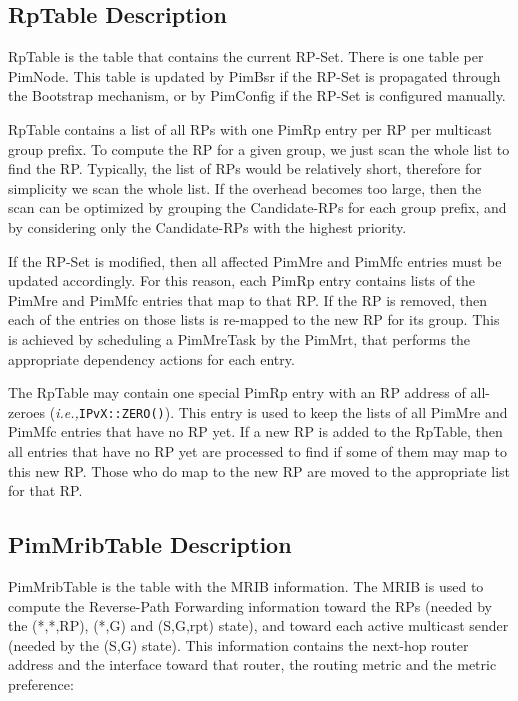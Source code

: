 \documentclass[11pt]{article}
\newcommand{\ie}{\emph{i.e.,}\xspace}
\begin{document}
\subsection{RpTable Description}

RpTable is the table that contains the current RP-Set. There is one
table per PimNode. This table is updated by PimBsr if the RP-Set is
propagated through the Bootstrap mechanism, or by PimConfig if the
RP-Set is configured manually.

RpTable contains a list of all RPs with one PimRp entry per RP per
multicast group prefix. To compute the RP for a given group,
we just scan the whole list to find the RP.
Typically, the list of RPs would be relatively short, therefore for
simplicity we scan the whole list. If the overhead becomes too large,
then the scan can be optimized by grouping the Candidate-RPs
for each group prefix, and by considering only the Candidate-RPs with
the highest priority.

If the RP-Set is modified, then all affected PimMre and PimMfc entries
must be updated accordingly. For this reason, each PimRp entry contains
lists of the PimMre and PimMfc entries that map to that RP. If the RP
is removed, then each of the entries on those lists is re-mapped to the
new RP for its group.
This is achieved by scheduling a PimMreTask by the PimMrt,
that performs the appropriate dependency actions for each entry.

The RpTable may contain one special PimRp entry with an RP address of
all-zeroes (\ie \verb=IPvX::ZERO()=). This entry is used to keep the
lists of all PimMre and
PimMfc entries that have no RP yet. If a new RP is added to the RpTable,
then all entries that have no RP yet are processed to find if some
of them may map to this new RP. Those who do map to the new RP are moved to
the appropriate list for that RP.


\subsection{PimMribTable Description}

PimMribTable is the table with the MRIB information. The MRIB is used
to compute the Reverse-Path Forwarding information toward the RPs
(needed by the (*,*,RP), (*,G) and (S,G,rpt) state), and toward
each active multicast sender (needed by the (S,G) state). This
information contains the next-hop router address and the interface
toward that router, the routing metric and the metric preference:
\end{document}
